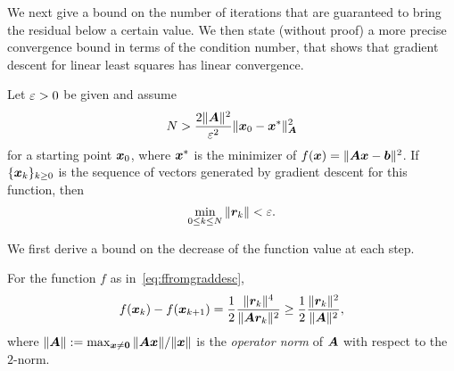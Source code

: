 We next give a bound on the number of iterations that are guaranteed to bring the residual below a certain value. We then state (without proof) a more precise convergence bound in terms of the condition number, that shows that gradient descent for linear least squares has linear convergence.

\begin{theorem}\label{thm:mainlect4}
Let $\varepsilon>0$ be given and assume
\begin{equation*}
 N> \frac{2\Vert {\bm{A}}\Vert^2}{\varepsilon^2}\Vert {\bm{x}_0-\bm{x}^*}\Vert_{\bm{A}}^2
\end{equation*}
for a starting point $\bm{x}_0$, where $\bm{x}^*$ is the minimizer of $f(\bm{x})=\Vert {\bm{A}\bm{x}-\bm{b}}\Vert^2$. If $\{\bm{x}_k\}_{k\geq 0}$ is the sequence of vectors generated by gradient descent for this function, then
\begin{equation*}
 \min_{0\leq k\leq N} \Vert {\bm{r}_k}\Vert<\varepsilon.
\end{equation*}
\end{theorem}

We first derive a bound on the decrease of the function value at each step.

\begin{lemma}\label{le:41}
 For the function $f$ as in~\eqref{eq:ffromgraddesc},
 \begin{equation*}
  f(\bm{x}_k)-f(\bm{x}_{k+1}) =  \frac{1}{2}\frac{\Vert {\bm{r}_k}\Vert^4}{\Vert {\bm{A}\bm{r}_k}\Vert^2}\geq \frac{1}{2}\frac{\Vert {\bm{r}_k}\Vert^2}{\Vert {\bm{A}}\Vert^2},
 \end{equation*}
where $\Vert {\bm{A}}\Vert := \max_{\bm{x}\neq \bm{0}} \Vert {\bm{A}\bm{x}}\Vert/\Vert {\bm{x}}\Vert$ is the {\em operator norm} of $\bm{A}$ with respect to the $2$-norm.
\end{lemma}


